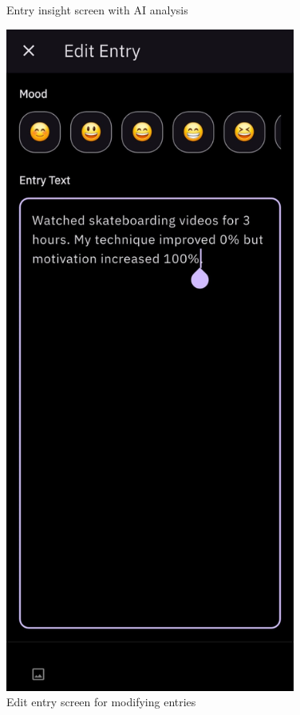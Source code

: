 \begin{figure}[H]
\begin{minipage}{0.45\textwidth}
\caption{Entry insight screen with AI analysis}
\label{fig:entry-insight-screen}
\end{minipage}
\hfill
\begin{minipage}{0.45\textwidth}
\centering
\includegraphics[width=0.85\textwidth]{files/imgs/prototype/edit_entry_screen.jpeg}
\caption{Edit entry screen for modifying entries}
\label{fig:edit-entry-screen}
\end{minipage}
\end{figure}

